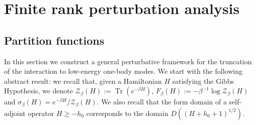 \documentclass[11pt]{amsart}
\newcommand{\1}{\mathbbm{1}}
\newcommand{\Tr}{\operatorname{Tr}}
\theoremstyle{plain}
\newtheorem{theorem}{Theorem}[section]
\theoremstyle{definition}
\theoremstyle{remark}
\numberwithin{equation}{section}
\begin{document}




\section{Finite rank perturbation analysis}

\subsection{Partition functions}\label{perturbationpartitionfunction}

\noindent In this section we construct a general perturbative framework for the truncation of the interaction to low-energy one-body modes. 
We start with the following abstract result: we recall that, given a Hamiltonian $H$ satisfying the Gibbs Hypothesis, we denote $\mathcal{Z}_\beta(H):=\Tr(e^{-\beta H})$,  $F_\beta(H):=-\beta^{-1}\log\mathcal{Z}_\beta(H)$ and $\sigma_\beta(H)=e^{-\beta H}/\mathcal{Z}_\beta(H)$.
We also recall that the form domain of a self-adjoint operator $H\ge -h_0$ corresponds to the domain $D((H+h_0+1)^{1/2})$.
\end{document}
